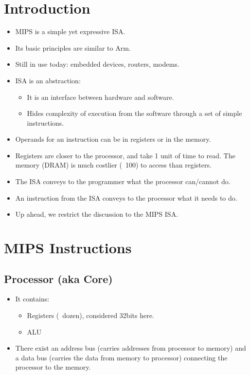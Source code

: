 \documentclass{report}
\begin{document}
\section{Introduction}
\begin{itemize}
\item MIPS is a simple yet expressive ISA.
\item Its basic principles are similar to Arm.
\item Still in use today: embedded devices, routers, modems.
\item ISA is an abstraction:
\begin{itemize}
    \item It is an interface between hardware and software.
    \item Hides complexity of execution from the software through a set of simple instructions.
\end{itemize}
\item Operands for an instruction can be in registers or in the memory.
\item Registers are closer to the processor, and take 1 unit of time to read. The memory  (DRAM) is much costlier (~100) to access than registers.
\item The ISA conveys to the programmer what the processor can/cannot do.
\item An instruction from the ISA conveys to the processor what it needs to do.
\item Up ahead, we restrict the discussion to the MIPS ISA.
\end{itemize}
\section{MIPS Instructions}
\subsection{Processor (aka Core)}
\begin{itemize}
\item It contains:
\begin{itemize}
\item Registers (~dozen), considered 32bits here.
\item ALU
\end{itemize}
\item There exist an address bus (carries addresses from processor to memory) and a data bus (carries the data from memory to processor) connecting the processor to the memory.
\end{itemize}
\end{document}
